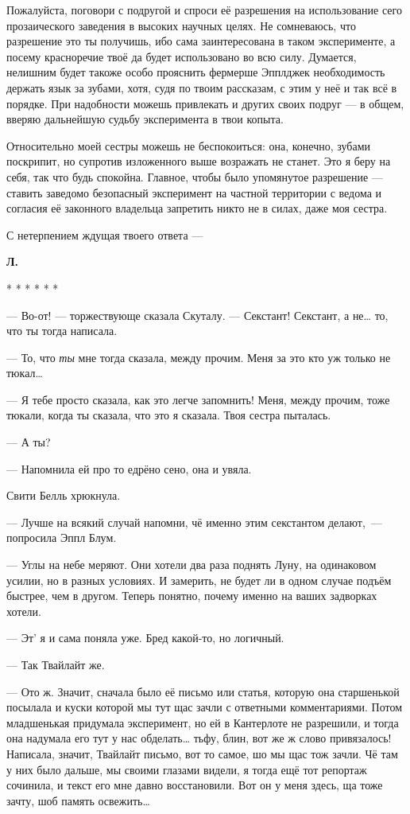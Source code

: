 \documentclass[fontsize=11pt,a5paper,titlepage=firstcover]{scrbook}
\begin{document}
Пожалуйста, поговори с подругой и спроси её разрешения на использование сего прозаического заведения в высоких научных целях. Не сомневаюсь, что разрешение это ты получишь, ибо сама заинтересована в таком эксперименте, а посему красноречие твоё да будет использовано во всю силу. Думается, нелишним будет такоже особо прояснить фермерше Эпплджек необходимость держать язык за зубами, хотя, судя по твоим рассказам, с этим у неё и так всё в порядке. При надобности можешь привлекать и других своих подруг --- в общем, вверяю дальнейшую судьбу эксперимента в твои копыта.

Относительно моей сестры можешь не беспокоиться: она, конечно, зубами поскрипит, но супротив изложенного выше возражать не станет. Это я беру на себя, так что будь спокойна. Главное, чтобы было упомянутое разрешение --- ставить заведомо безопасный эксперимент на частной территории с ведома и согласия её законного владельца запретить никто не в силах, даже моя сестра.

С нетерпением ждущая твоего ответа ---
\begin{flushright}\textbf{Л.}\end{flushright}
\begin{center}
	* * * * * *
\end{center}

--- Во-от! --- торжествующе сказала Скуталу. --- Секстант! Секстант, а не{\ldots} то, что ты тогда написала.

--- То, что \emph{ты} мне тогда сказала, между прочим. Меня за это кто уж только не тюкал{\ldots}

--- Я тебе просто сказала, как это легче запомнить! Меня, между прочим, тоже тюкали, когда ты сказала, что это я сказала. Твоя сестра пыталась.

--- А ты?

--- Напомнила ей про то едрёно сено, она и увяла.

Свити Белль хрюкнула.

--- Лучше на всякий случай напомни, чё именно этим секстантом делают,~--- попросила Эппл Блум.

--- Углы на небе меряют. Они хотели два раза поднять Луну, на одинаковом усилии, но в разных условиях. И замерить, не будет ли в одном случае подъём быстрее, чем в другом. Теперь понятно, почему именно на ваших задворках хотели.

--- Эт’ я и сама поняла уже. Бред какой-то, но логичный.

--- Так Твайлайт же.

--- Ото ж. Значит, сначала было её письмо или статья, которую она старшенькой посылала и куски которой мы тут щас зачли с ответными комментариями. Потом младшенькая придумала эксперимент, но ей в Кантерлоте не разрешили, и тогда она надумала его тут у нас обделать{\ldots} тьфу, блин, вот же ж слово привязалось! Написала, значит, Твайлайт письмо, вот то самое, шо мы щас тож зачли. Чё там у них было дальше, мы своими глазами видели, я тогда ещё тот репортаж сочинила, и текст его мне давно восстановили. Вот он у меня здесь, ща тоже зачту, шоб память освежить{\ldots}
\end{document}
